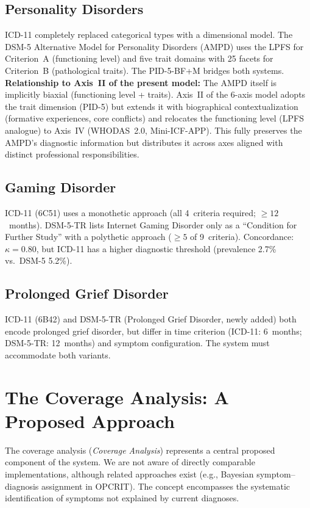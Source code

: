 \documentclass[11pt,a4paper]{article}
\begin{document}
\subsection{Personality Disorders}

ICD-11 completely replaced categorical types with a dimensional model. The DSM-5 Alternative Model for Personality Disorders (AMPD) uses the LPFS for Criterion~A (functioning level) and five trait domains with 25 facets for Criterion~B (pathological traits). The PID-5-BF+M bridges both systems. \textbf{Relationship to Axis~II of the present model:} The AMPD itself is implicitly biaxial (functioning level + traits). Axis~II of the 6-axis model adopts the trait dimension (PID-5) but extends it with biographical contextualization (formative experiences, core conflicts) and relocates the functioning level (LPFS analogue) to Axis~IV (WHODAS~2.0, Mini-ICF-APP). This fully preserves the AMPD's diagnostic information but distributes it across axes aligned with distinct professional responsibilities.

\subsection{Gaming Disorder}

ICD-11 (6C51) uses a monothetic approach (all 4~criteria required; $\geq 12$~months). DSM-5-TR lists Internet Gaming Disorder only as a ``Condition for Further Study'' with a polythetic approach ($\geq 5$ of 9~criteria). Concordance: $\kappa = 0.80$, but ICD-11 has a higher diagnostic threshold (prevalence 2.7\% vs.\ DSM-5 5.2\%).

\subsection{Prolonged Grief Disorder}

ICD-11 (6B42) and DSM-5-TR (Prolonged Grief Disorder, newly added) both encode prolonged grief disorder, but differ in time criterion (ICD-11: 6~months; DSM-5-TR: 12~months) and symptom configuration. The system must accommodate both variants.

\section{The Coverage Analysis: A Proposed Approach}
\label{sec:coverage}

The coverage analysis (\textit{Coverage Analysis}) represents a central proposed component of the system. We are not aware of directly comparable implementations, although related approaches exist (e.g., Bayesian symptom--diagnosis assignment in OPCRIT). The concept encompasses the systematic identification of symptoms not explained by current diagnoses.
\end{document}
